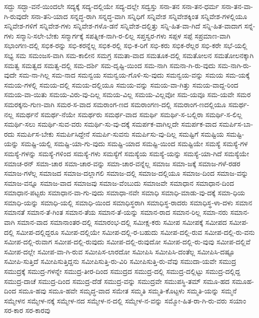 {ಸದ್ದು
ಸದ್ಭಾ-ವನೆ-ಯಿಂದಲೇ
ಸದ್ಯಕ್ಕೆ
ಸದ್ಯ-ದಲ್ಲಿಯೇ
ಸದ್ಯ-ದಲ್ಲೇ
ಸದ್ವಸ್ತು
ಸನಾ-ತನ
ಸನಾ-ತನ-ಧರ್ಮ
ಸನಾ-ತನ-ವಾ-ಗಿ-ರುವುದೇ
ಸನಾ-ತನಿ-ಯಾದ
ಸನ್ನದ್ಧ-ರಾಗಿ
ಸನ್ನದ್ಧ-ವಾಗಿ
ಸನ್ನಿಧಿಗೆ
ಸನ್ನಿವೇಶ
ಸನ್ನಿವೇಶಕ್ಕಿಂತ
ಸನ್ನಿವೇಶ-ಗಳಲ್ಲಿಯೂ
ಸನ್ನಿವೇಶ-ಗಳಿಗೆ
ಸನ್ನಿವೇಶ-ಗಳು
ಸನ್ನಿವೇಶ-ಗಳೊ-ಡನೆ
ಸನ್ನಿವೇಶ-ದಲ್ಲಿತ್ತು
ಸನ್ನಿ-ಹಿತ-ವಾ-ಗಿದೆ
ಸನ್ನಿ-ಹಿತ-ವಾದಾಗ
ಸನ್ನೆ-ಗಳು
ಸನ್ಮಾನಿ-ಸಲೇ-ಬೇಕು
ಸನ್ಮಾರ್ಗಕ್ಕೆ
ಸಪತ್ನೀಕ-ನಾಗಿ-ರ-ಲಿಲ್ಲ
ಸಪ್ತಸ್ವರ-ಗಳು
ಸಪ್ಪಳ
ಸಪ್ಪೆ
ಸಪ್ರಮಾಣ-ವಾಗಿ
ಸಭಾಂಗಣ-ದಲ್ಲಿ
ಸಭಿಕ-ರನ್ನು
ಸಭಿ-ಕರನ್ನೆಲ್ಲ
ಸಭಿಕ-ರಲ್ಲಿ
ಸಭಿ-ಕ-ರಿಗೆ
ಸಭಿ-ಕರು
ಸಭಿಕ-ರೆಲ್ಲರ
ಸಭಿ-ಕರೇ
ಸಭೆ-ಯಲ್ಲಿ
ಸಭ್ಯ
ಸಮ
ಸಮಂಜಸ-ವಾಗಿ
ಸಮ-ಕಾಲೀನ
ಸಮಗ್ರ
ಸಮತಾ-ವಾದ
ಸಮತೂಕ-ದಲ್ಲಿ
ಸಮತೋಲನ
ಸಮತೋಲನಕ್ಕಾಗಿ
ಸಮತ್ವ
ಸಮತ್ವದ
ಸಮತ್ವ-ದಲ್ಲಿ
ಸಮ-ದರ್ಶಿ
ಸಮ-ದೃಷ್ಟಿ-ಯಿಂದ
ಸಮ-ನಾಗಿ
ಸಮನಾ-ಗಿ-ರು-ವುದು
ಸಮ-ನಾಗಿ-ರು-ವುದೇ
ಸಮ-ನಾ-ಗಿಲ್ಲ
ಸಮ-ನಾದ
ಸಮನ್ವಯ
ಸಮನ್ವಯ-ಗೊಳಿ-ಸು-ವುದು
ಸಮನ್ವಯ-ವನ್ನು
ಸಮಯ
ಸಮ-ಯಕ್ಕೆ
ಸಮಯ-ಗಳಲ್ಲಿ
ಸಮಯ-ದಲ್ಲಿ
ಸಮಯ-ದಲ್ಲಿಯೂ
ಸಮಯ-ವನ್ನು
ಸಮಯ-ವಾ-ಗಿತ್ತು
ಸಮಯ-ವಾದ್ದ-ರಿಂದ
ಸಮಯ-ವಾ-ಯಿತು
ಸಮಯ-ವಿರು-ವು-ದಿಲ್ಲ
ಸಮಯ-ವಿಲ್ಲ
ಸಮಯ-ವಿಲ್ಲವೋ
ಸಮ-ಯವೂ
ಸಮ-ಯವೇ
ಸಮರ
ಸಮರಕ್ಕನು-ಗುಣ-ವಾಗಿ
ಸಮರ-ಸ-ವಾದ
ಸಮರಾಂಗ-ಣದ
ಸಮರಾಂಗಣ-ದಲ್ಲಿ
ಸಮರಾಂಗ-ಣದಲ್ಲಿಯೂ
ಸಮರ್ಥ-ನಲ್ಲ
ಸಮರ್ಥನೆ
ಸಮರ್ಥ-ನೆಯೇ
ಸಮರ್ಥರು
ಸಮರ್ಥ-ವಾದ
ಸಮರ್ಥಿ
ಸಮರ್ಥಿ-ಸ-ಬಲ್ಲಿರಾ
ಸಮರ್ಥಿ-ಸ-ಲಿಲ್ಲ
ಸಮರ್ಥಿ-ಸಲು
ಸಮರ್ಥಿ-ಸುವ-ವರು
ಸಮರ್ಥಿ-ಸು-ವು-ದಕ್ಕೆ
ಸಮರ್ಪಕ-ವಾಗಿಲ್ಲದೇ
ಸಮರ್ಪಕ-ವಾದ
ಸಮರ್ಪಿಸ-ಬಾ-ರದು
ಸಮರ್ಪಿಸ-ಬೇಕು
ಸಮರ್ಪಿಸಿದ್ದೇನೆ
ಸಮರ್ಪಿ-ಸುವನು
ಸಮರ್ಪಿಸು-ವು-ದಿಲ್ಲ
ಸಮಷ್ಟಿಗೆ
ಸಮಷ್ಟಿಯ
ಸಮಷ್ಟಿ-ಯನ್ನು
ಸಮಷ್ಟಿ-ಯಲ್ಲಿ
ಸಮಷ್ಟಿ-ಯಾ-ಗು-ವುದು
ಸಮಷ್ಟಿ-ಯಾದ
ಸಮಷ್ಟಿ-ಯಿಂದ
ಸಮಷ್ಟಿಯೇ
ಸಮಸ್ಯೆ
ಸಮಸ್ಯೆ-ಗಳ
ಸಮಸ್ಯೆ-ಗಳನ್ನು
ಸಮಸ್ಯೆ-ಗಳಿಂದ
ಸಮಸ್ಯೆ-ಗಳು
ಸಮಸ್ಯೆಗೆ
ಸಮಸ್ಯೆಯ
ಸಮಸ್ಯೆ-ಯನ್ನು
ಸಮಸ್ಯೆ-ಯಾ-ಗಿದೆ
ಸಮಸ್ಯೆಯೇ
ಸಮಾಚ-ರನ್
ಸಮಾ-ಚಾರ
ಸಮಾ-ಚಾರ-ವನ್ನು
ಸಮಾ-ಚಾರ-ವನ್ನೆಲ್ಲ
ಸಮಾಜ
ಸಮಾ-ಜಕ್ಕೆ
ಸಮಾಜ-ಗಳೆ-ರಡರ
ಸಮಾಜ-ಗಳೆಲ್ಲ
ಸಮಾಜದ
ಸಮಾಜ-ದಲ್ಲಾಗಲಿ
ಸಮಾಜ-ದಲ್ಲಿ
ಸಮಾಜ-ದಲ್ಲಿಯೂ
ಸಮಾಜ-ದಿಂದ
ಸಮಾಜ-ವನ್ನು
ಸಮಾಜ-ವನ್ನೂ
ಸಮಾಜ-ವಾದ
ಸಮಾಜವು
ಸಮಾಜ-ವೆಂಬುದು
ಸಮಾಜವೇ
ಸಮಾಧಾನ
ಸಮಾಧಾನ-ದಿಂದ
ಸಮಾಧಾನ-ಪಟ್ಟರು
ಸಮಾಧಾನ-ವಾ-ಗು-ವುದು
ಸಮಾಧಾ-ನವೇ
ಸಮಾಧಿ
ಸಮಾಧಿ-ಮಾಡು-ವು-ದಕ್ಕೆ
ಸಮಾ-ಧಿಯ
ಸಮಾಧಿ-ಯನ್ನು
ಸಮಾಧಿ-ಯಲ್ಲಿ
ಸಮಾಧಿ-ಯಿಂದ
ಸಮಾಧಿಸ್ಥರಾಗಿ
ಸಮಾಧಿಸ್ಥ-ರಾದರು
ಸಮಾಧಿಸ್ಥ-ಳಾ-ದಳು
ಸಮಾನ
ಸಮಾನತೆ
ಸಮಾನ-ತೆ-ಗಿಂತ
ಸಮಾನ-ತೆಯ
ಸಮಾನ-ತೆ-ಯನ್ನು
ಸಮಾನ-ರಾದ
ಸಮಾನ-ರಿಲ್ಲ
ಸಮಾ-ನರು
ಸಮಾನ-ವಾಗಿ
ಸಮಾನ-ವಾದ
ಸಮಾನಾಂತರ-ದಲ್ಲಿ
ಸಮಾರಂಭ-ದಲ್ಲಿ
ಸಮೀಕ್ಷ-ಕರು
ಸಮೀಪ
ಸಮೀಪಕ್ಕೆ
ಸಮೀಪದ
ಸಮೀಪ-ದಲ್ಲಿ
ಸಮೀಪ-ದಲ್ಲಿದ್ದರೂ
ಸಮೀಪ-ದಲ್ಲಿಯೇ
ಸಮೀಪ-ದಲ್ಲಿ-ರ-ಬಹುದು
ಸಮೀಪ-ದಲ್ಲಿ-ರುವ
ಸಮೀಪ-ದಲ್ಲಿ-ರು-ವನು
ಸಮೀಪ-ದಲ್ಲಿ-ರುವಾಗ
ಸಮೀಪ-ದಲ್ಲಿ-ರುವುದು
ಸಮೀಪ-ದಲ್ಲಿ-ರುವುದೋ
ಸಮೀಪ-ದಲ್ಲಿ-ರು-ವುವು
ಸಮೀಪ-ದಲ್ಲಿವೆ
ಸಮೀಪ-ದಲ್ಲೇ
ಸಮೀಪ-ವಾ-ಗಿ-ರುವ
ಸಮೀಪಿಸ-ಲಾರದೋ
ಸಮೀಪಿಸಿ
ಸಮೀಪಿಸಿ-ದಂತೆಲ್ಲ
ಸಮೀಪಿಸಿ-ದಷ್ಟೂ
ಸಮೀಪಿ-ಸುತ್ತಿದೆ
ಸಮೀಪಿಸುತ್ತಿದ್ದನು
ಸಮೀಪಿಸುತ್ತಿ-ರು-ವಿರಿ
ಸಮೀಪಿಸುತ್ತಿ-ರು-ವೆವು
ಸಮುದಾ-ಯವೇ
ಸಮುದ್ರ
ಸಮುದ್ರಕ್ಕೆ
ಸಮುದ್ರ-ಗಳನ್ನೇ
ಸಮುದ್ರ-ತೀರ-ದಿಂದ
ಸಮುದ್ರದ
ಸಮುದ್ರ-ದಲ್ಲಿ
ಸಮುದ್ರ-ದಲ್ಲಿಟ್ಟು
ಸಮುದ್ರ-ದಲ್ಲಿದ್ದ
ಸಮುದ್ರ-ದಾಚೆ
ಸಮುದ್ರ-ದಿಂದ
ಸಮುದ್ರ-ದೆಡೆ
ಸಮುದ್ರ-ವನ್ನು
ಸಮುದ್ರವೇ
ಸಮುಪಸ್ಥಿ-ತಮ್
ಸಮೂ-ಹದ
ಸಮೂಹ-ದಿಂದ
ಸಮೂ-ಹವು
ಸಮೂ-ಹವೇ
ಸಮೃದ್ಧ-ವಾದ
ಸಮೇತ
ಸಮ್ಮತಿ
ಸಮ್ಮತಿ-ಕೊಟ್ಟಳು
ಸಮ್ಮತಿ-ಯನ್ನು
ಸಮ್ಮನೆ
ಸಮ್ಮೇಳನ
ಸಮ್ಮೇಳ-ನಕ್ಕೆ
ಸಮ್ಮೇಳ-ನದ
ಸಮ್ಮೇಳ-ನ-ದಲ್ಲಿ
ಸಮ್ಮೇಳ-ನ-ವನ್ನು
ಸಮ್ಮೋ-ಹಿತ-ರಾ-ಗಿ-ರು-ವರು
ಸಯಾಂ
ಸರ-ಕಾರ
ಸರ-ಕಾರವು
}
